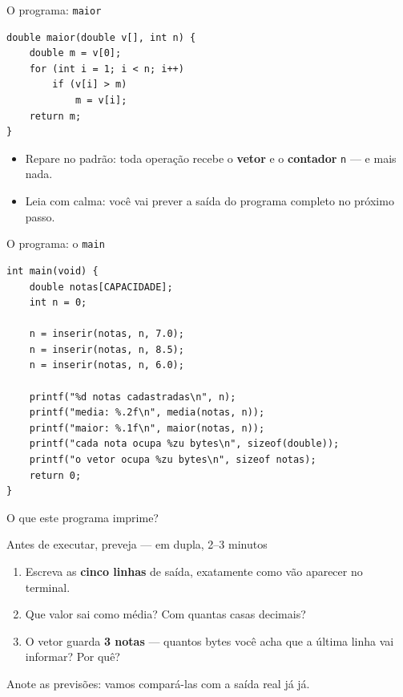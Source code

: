 \documentclass[aspectratio=169]{beamer}
\begin{document}
\begin{frame}[fragile]{O programa: \texttt{maior}}
\begin{lstlisting}
double maior(double v[], int n) {
    double m = v[0];
    for (int i = 1; i < n; i++)
        if (v[i] > m)
            m = v[i];
    return m;
}
\end{lstlisting}
  \begin{itemize}
    \item Repare no padrão: toda operação recebe o \textbf{vetor} e o
      \textbf{contador} \texttt{n} --- e mais nada.
    \item Leia com calma: você vai prever a saída do programa completo no
      próximo passo.
  \end{itemize}
\end{frame}

\begin{frame}[fragile,shrink=5]{O programa: o \texttt{main}}
\begin{lstlisting}
int main(void) {
    double notas[CAPACIDADE];
    int n = 0;

    n = inserir(notas, n, 7.0);
    n = inserir(notas, n, 8.5);
    n = inserir(notas, n, 6.0);

    printf("%d notas cadastradas\n", n);
    printf("media: %.2f\n", media(notas, n));
    printf("maior: %.1f\n", maior(notas, n));
    printf("cada nota ocupa %zu bytes\n", sizeof(double));
    printf("o vetor ocupa %zu bytes\n", sizeof notas);
    return 0;
}
\end{lstlisting}
\end{frame}

\begin{frame}{O que este programa imprime?}
  \begin{block}{Antes de executar, preveja --- em dupla, 2--3 minutos}
    \begin{enumerate}
      \item Escreva as \textbf{cinco linhas} de saída, exatamente como vão
        aparecer no terminal.
      \item Que valor sai como média? Com quantas casas decimais?
      \item O vetor guarda \textbf{3 notas} --- quantos bytes você acha que a
        última linha vai informar? Por quê?
    \end{enumerate}
  \end{block}
  \vspace{0.5em}
  Anote as previsões: vamos compará-las com a saída real já já.
\end{frame}
\end{document}
